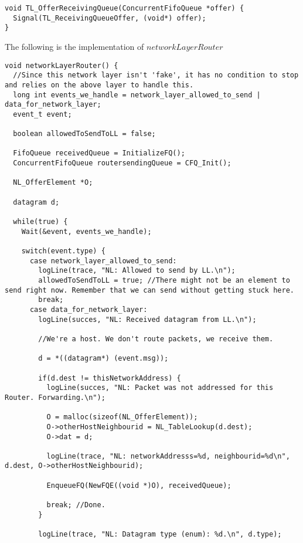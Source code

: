 \begin{lstlisting}
void TL_OfferReceivingQueue(ConcurrentFifoQueue *offer) {
  Signal(TL_ReceivingQueueOffer, (void*) offer);
}
\end{lstlisting}









The following is the implementation of $networkLayerRouter$


\begin{lstlisting}
void networkLayerRouter() {
  //Since this network layer isn't 'fake', it has no condition to stop and relies on the above layer to handle this.
  long int events_we_handle = network_layer_allowed_to_send | data_for_network_layer;
  event_t event;

  boolean allowedToSendToLL = false;

  FifoQueue receivedQueue = InitializeFQ();
  ConcurrentFifoQueue routersendingQueue = CFQ_Init();

  NL_OfferElement *O;

  datagram d;

  while(true) {
    Wait(&event, events_we_handle);

    switch(event.type) {
      case network_layer_allowed_to_send:
        logLine(trace, "NL: Allowed to send by LL.\n");
        allowedToSendToLL = true; //There might not be an element to send right now. Remember that we can send without getting stuck here.
        break;
      case data_for_network_layer:
        logLine(succes, "NL: Received datagram from LL.\n");

        //We're a host. We don't route packets, we receive them.

        d = *((datagram*) (event.msg));

        if(d.dest != thisNetworkAddress) {
          logLine(succes, "NL: Packet was not addressed for this Router. Forwarding.\n");

          O = malloc(sizeof(NL_OfferElement));
          O->otherHostNeighbourid = NL_TableLookup(d.dest);
          O->dat = d;

          logLine(trace, "NL: networkAddresss=%d, neighbourid=%d\n", d.dest, O->otherHostNeighbourid);

          EnqueueFQ(NewFQE((void *)O), receivedQueue);

          break; //Done.
        }

        logLine(trace, "NL: Datagram type (enum): %d.\n", d.type);


\end{lstlisting}
